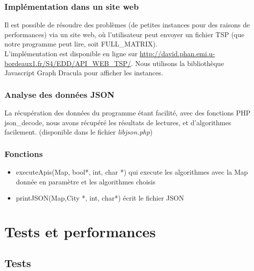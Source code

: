 \documentclass[12pt]{report}
\begin{document}
{{{{{{{\subsection{Implémentation dans un site web}

Il est possible de résoudre des problèmes (de petites instances pour des raisons de performances) via un site web, où l'utilisateur peut envoyer un fichier TSP (que notre programme peut lire, soit FULL\_MATRIX).\\
L'implémentation est disponible en ligne sur \url{http://david.phan.emi.u-bordeaux1.fr/S4/EDD/API_WEB_TSP/}. Nous utilisons la bibliothèque Javascript Graph Dracula pour afficher les instances.

\subsection{Analyse des données JSON}

La récupération des données du programme étant facilité, avec des fonctions PHP json\_decode, nous avons récupéré les résultats de lectures, et d'algorithmes facilement. (disponible dans le fichier \textit{libjson.php})

\subsection{Fonctions}

\begin{itemize}
	\item executeApis(Map, bool*, int, char *) qui execute les algorithmes avec la Map donnée en paramètre et les algorithmes choisis
    \item printJSON(Map,City *, int, char*) écrit le fichier JSON
\end{itemize}




\chapter{Tests et performances}


\section{Tests}

}}}}}}}
\end{document}
